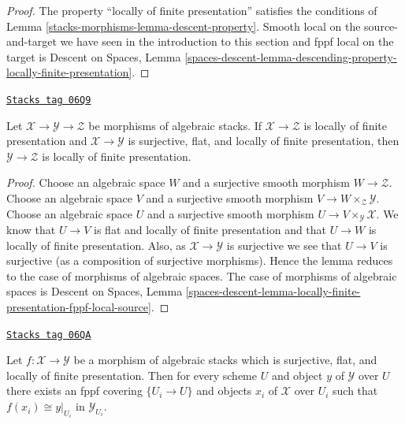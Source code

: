 \begin{proof}
The property
``locally of finite presentation''
satisfies the conditions of Lemma \ref{stacks-morphisms-lemma-descent-property}.
Smooth local on the source-and-target we have seen in the
introduction to this section and fppf local on the target is
Descent on Spaces, Lemma
\ref{spaces-descent-lemma-descending-property-locally-finite-presentation}.
\end{proof}

\begin{lemma}
\label{stacks-morphisms-lemma-flat-finite-presentation-permanence}
\href{https://stacks.math.columbia.edu/tag/06Q9}{\texttt{Stacks tag 06Q9}}

Let $\mathcal{X} \to \mathcal{Y} \to \mathcal{Z}$ be morphisms of
algebraic stacks. If $\mathcal{X} \to \mathcal{Z}$ is locally of finite
presentation and $\mathcal{X} \to \mathcal{Y}$ is surjective, flat, and
locally of finite presentation, then $\mathcal{Y} \to \mathcal{Z}$
is locally of finite presentation.
\end{lemma}

\begin{proof}
Choose an algebraic space $W$ and a surjective smooth morphism
$W \to \mathcal{Z}$. Choose an algebraic space $V$ and a surjective smooth
morphism $V \to W \times_\mathcal{Z} \mathcal{Y}$. Choose an algebraic space
$U$ and a surjective smooth morphism $U \to V \times_\mathcal{Y} \mathcal{X}$.
We know that $U \to V$ is flat and locally of finite presentation
and that $U \to W$ is locally of finite presentation.
Also, as $\mathcal{X} \to \mathcal{Y}$ is surjective we see that
$U \to V$ is surjective (as a composition of surjective morphisms).
Hence the lemma reduces to the case of morphisms of algebraic spaces.
The case of morphisms of algebraic spaces is
Descent on Spaces, Lemma
\ref{spaces-descent-lemma-locally-finite-presentation-fppf-local-source}.
\end{proof}

\begin{lemma}
\label{stacks-morphisms-lemma-surjective-flat-locally-finite-presentation}
\href{https://stacks.math.columbia.edu/tag/06QA}{\texttt{Stacks tag 06QA}}

Let $f : \mathcal{X} \to \mathcal{Y}$ be a morphism of algebraic stacks
which is surjective, flat, and locally of finite presentation.
Then for every scheme $U$ and object $y$ of $\mathcal{Y}$ over $U$
there exists an fppf covering $\{U_i \to U\}$ and objects $x_i$
of $\mathcal{X}$ over $U_i$ such that $f(x_i) \cong y|_{U_i}$ in
$\mathcal{Y}_{U_i}$.
\end{lemma}

